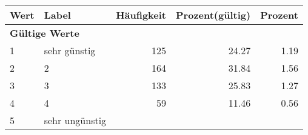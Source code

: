      \begin{longtable}{lXrrr}
     \toprule
     \textbf{Wert} & \textbf{Label} & \textbf{Häufigkeit} & \textbf{Prozent(gültig)} & \textbf{Prozent} \\
     \endhead
     \midrule
     \multicolumn{5}{l}{\textbf{Gültige Werte}}\\

     1 &
     \multicolumn{1}{X}{ sehr günstig   } &


       \num{125} &
       \num[round-mode=places,round-precision=2]{24,27} &
         \num[round-mode=places,round-precision=2]{1,19} \\

     2 &
     \multicolumn{1}{X}{ 2   } &


       \num{164} &
       \num[round-mode=places,round-precision=2]{31,84} &
         \num[round-mode=places,round-precision=2]{1,56} \\

     3 &
     \multicolumn{1}{X}{ 3   } &


       \num{133} &
       \num[round-mode=places,round-precision=2]{25,83} &
         \num[round-mode=places,round-precision=2]{1,27} \\

     4 &
     \multicolumn{1}{X}{ 4   } &


       \num{59} &
       \num[round-mode=places,round-precision=2]{11,46} &
         \num[round-mode=places,round-precision=2]{0,56} \\

     5 &
     \multicolumn{1}{X}{ sehr ungünstig   } &



\end{longtable}
